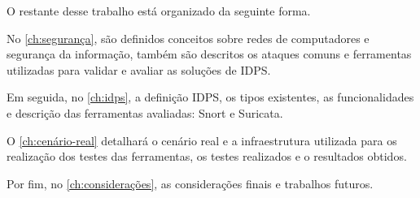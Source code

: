 O restante desse trabalho está organizado da seguinte forma.

No \autoref{ch:segurança}, são definidos conceitos sobre redes de computadores e segurança da informação, também são descritos os ataques comuns e ferramentas utilizadas para validar e avaliar as soluções de IDPS.

Em seguida, no \autoref{ch:idps}, a definição IDPS, os tipos existentes, as funcionalidades e descrição das ferramentas avaliadas: Snort e Suricata.

O \autoref{ch:cenário-real} detalhará o cenário real e a infraestrutura utilizada para os realização dos testes das ferramentas, os testes realizados e o resultados obtidos.

Por fim, no \autoref{ch:considerações}, as considerações finais e trabalhos futuros.
